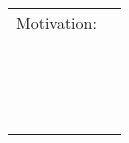 \documentclass[12pt]{article}
\begin{document}
\vspace{3mm}
\begin{tabular}{p{4cm}p{14cm}}
    Motivation: & \dotfill \\
    & \dotfill \\
    & \dotfill \\
    & \dotfill \\
    & \dotfill \\
    & \dotfill \\
    & \dotfill \\
    & \dotfill \\
    & \dotfill \\
    & \dotfill \\
    & \dotfill \\
    & \dotfill \\
    & \dotfill \\
    & \dotfill \\
    & \dotfill \\
    & \dotfill \\
    & \dotfill \\
\end{tabular}
\end{document}

